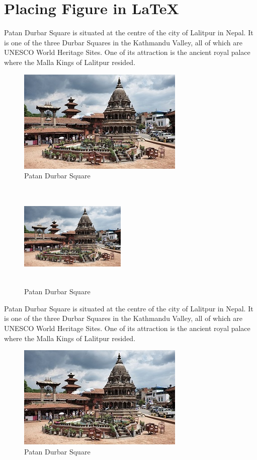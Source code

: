 \documentclass[12pt]{report}
\begin{document}
\section{Placing Figure in \LaTeX}
Patan Durbar Square is situated at the centre of the city of Lalitpur in Nepal. It is one of the three Durbar Squares in the Kathmandu Valley, all of which are UNESCO World Heritage Sites. One of its attraction is the ancient royal palace where the Malla Kings of Lalitpur resided.

\begin{figure}[!hbt]
\centering
\includegraphics[scale=0.1]{patandurbar.jpg}
\caption{Patan Durbar Square}
\end{figure}

\begin{figure}[h]
\centering
\includegraphics[width=2in,height=2in]{patandurbar.jpg}
\caption{Patan Durbar Square}
\end{figure}

Patan Durbar Square is situated at the centre of the city of Lalitpur in Nepal. It is one of the three Durbar Squares in the Kathmandu Valley, all of which are UNESCO World Heritage Sites. One of its attraction is the ancient royal palace where the Malla Kings of Lalitpur resided.
\begin{figure}[h]
\centering
\includegraphics[scale=0.01,angle=10]{patandurbar.jpg}
\caption{Patan Durbar Square}
\end{figure}
\end{document}
